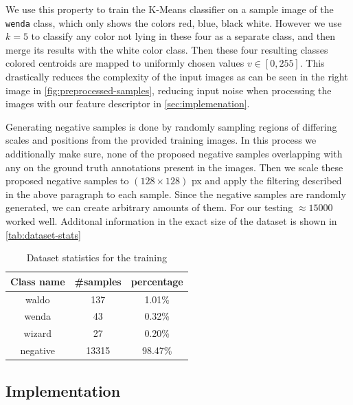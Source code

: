 \documentclass[11pt]{article}
\begin{document}
We use this property to train the K-Means classifier on a sample image of the \verb|wenda| class, which only 
shows the colors red, blue, black white. However we use \( k=5 \) to classify any color not lying in these four as a separate class, and then merge 
its results with the white color class. Then these four resulting classes colored centroids are mapped to uniformly
chosen values \( v \in [0, 255] \). This drastically reduces the complexity of the input images as can be seen in the right image in \autoref{fig:preprocessed-samples},
reducing input noise when processing the images with our feature descriptor in \autoref{sec:implemenation}.

\vspace{0.5cm}
Generating negative samples is done by randomly sampling regions of differing scales and positions from the provided training images.
In this process we additionally make sure, none of the proposed negative samples overlapping with any on the ground truth annotations present in the images.
Then we scale these proposed negative samples to \( (128 \times 128 ) \) px and apply the filtering described in the above paragraph to each sample.
Since the negative samples are randomly generated, we can create arbitrary amounts of them. 
For our testing \( \approx15000 \) worked well. 
Additonal information in the exact size of the dataset is shown in \autoref{tab:dataset-stats}

\begin{table}[]
    \centering
    \begin{tabular}{ccc}
        \toprule
        Class name & \#samples & percentage \\
        \midrule
        waldo & 137 &  1.01\% \\
        wenda & 43&  0.32\% \\
        wizard& 27&  0.20\% \\
        negative & 13315&  98.47\% \\
        \bottomrule
    \end{tabular}
    \caption{Dataset statistics for the training}
    \label{tab:dataset-stats}
\end{table}


\subsection{Implementation}\label{sec:implemenation}
\end{document}
